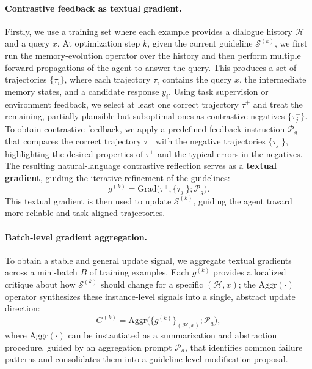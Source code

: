 \paragraph{Contrastive feedback as textual gradient.}
Firstly, we use a training set where each example provides a dialogue history \(\mathcal{H}\) and a query \(x\). At optimization step \(k\), given the current guideline \(\mathcal{S}^{(k)}\), we first run the memory-evolution operator over the history and then perform multiple forward propagations of the agent to answer the query. This produces a set of trajectories \(\{\tau_i\}\), where each trajectory \(\tau_i\) contains the query \(x\), the intermediate memory states, and a candidate response \(y_i\). Using task supervision or environment feedback, we select at least one correct trajectory \(\tau^{+}\) and treat the remaining, partially plausible but suboptimal ones as contrastive negatives \(\{\tau_j^{-}\}\).
To obtain contrastive feedback, we apply a predefined feedback instruction \(\mathcal{P}_g\) that compares the correct trajectory \(\tau^{+}\) with the negative trajectories \(\{\tau_j^{-}\}\), highlighting the desired properties of \(\tau^{+}\) and the typical errors in the negatives. The resulting natural-language contrastive reflection serves as a \textbf{textual gradient}, guiding the iterative refinement of the guidelines:
\begin{equation}
g^{(k)} = \mathrm{Grad}\big(\tau^{+}, \{\tau_j^{-}\} ; \mathcal{P}_g\big).
\end{equation}
This textual gradient is then used to update \(\mathcal{S}^{(k)}\), guiding the agent toward more reliable and task-aligned trajectories.

\paragraph{Batch-level gradient aggregation.}
To obtain a stable and general update signal, we aggregate textual gradients across a mini-batch \(B\) of training examples. Each \(g^{(k)}\) provides a localized critique about how \(\mathcal{S}^{(k)}\) should change for a specific \((\mathcal{H}, x)\); the $\mathrm{Aggr}(\cdot)$ operator synthesizes these instance-level signals into a single, abstract update direction:
\begin{equation}
G^{(k)} = \mathrm{Aggr}\big(\{g^{(k)}\}_{(\mathcal{H},x)}; \mathcal{P}_a\big),
\end{equation}
where \(\mathrm{Aggr}(\cdot)\) can be instantiated as a summarization and abstraction procedure, guided by an aggregation prompt \(\mathcal{P}_a\), that identifies common failure patterns and consolidates them into a guideline-level modification proposal.


